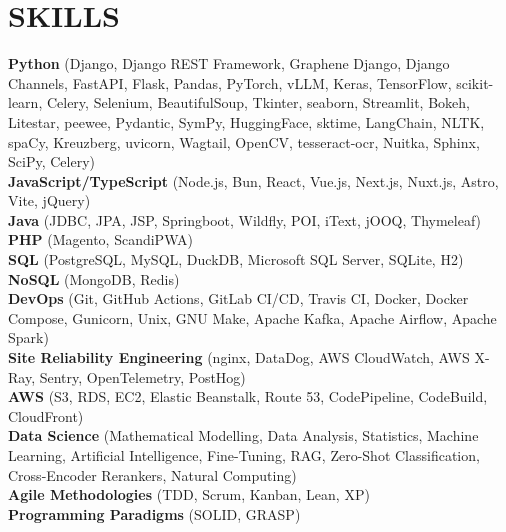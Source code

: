 \documentclass[a4paper,9pt]{extarticle}
\begin{document}
\section*{SKILLS}

\noindent
\textbf{Python} (Django, Django REST Framework, Graphene Django, Django Channels, FastAPI, Flask, Pandas, PyTorch, vLLM, Keras, TensorFlow, scikit-learn, Celery, Selenium, BeautifulSoup, Tkinter, seaborn, Streamlit, Bokeh, Litestar, peewee, Pydantic, SymPy, HuggingFace, sktime, LangChain, NLTK, spaCy, Kreuzberg, uvicorn, Wagtail, OpenCV, tesseract-ocr, Nuitka, Sphinx, SciPy, Celery) \\
\textbf{JavaScript/TypeScript} (Node.js, Bun, React, Vue.js, Next.js, Nuxt.js, Astro, Vite, jQuery) \\
\textbf{Java} (JDBC, JPA, JSP, Springboot, Wildfly, POI, iText, jOOQ, Thymeleaf) \\
\textbf{PHP} (Magento, ScandiPWA) \\
\textbf{SQL} (PostgreSQL, MySQL, DuckDB, Microsoft SQL Server, SQLite, H2) \\
\textbf{NoSQL} (MongoDB, Redis) \\
\textbf{DevOps} (Git, GitHub Actions, GitLab CI/CD, Travis CI, Docker, Docker Compose, Gunicorn, Unix, GNU Make, Apache Kafka, Apache Airflow, Apache Spark) \\
\textbf{Site Reliability Engineering} (nginx, DataDog, AWS CloudWatch, AWS X-Ray, Sentry, OpenTelemetry, PostHog) \\
\textbf{AWS} (S3, RDS, EC2, Elastic Beanstalk, Route 53, CodePipeline, CodeBuild, CloudFront) \\
\textbf{Data Science} (Mathematical Modelling, Data Analysis, Statistics, Machine Learning, Artificial Intelligence, Fine-Tuning, RAG, Zero-Shot Classification, Cross-Encoder Rerankers, Natural Computing) \\
\textbf{Agile Methodologies} (TDD, Scrum, Kanban, Lean, XP) \\
\textbf{Programming Paradigms} (SOLID, GRASP) \\

\end{document}
